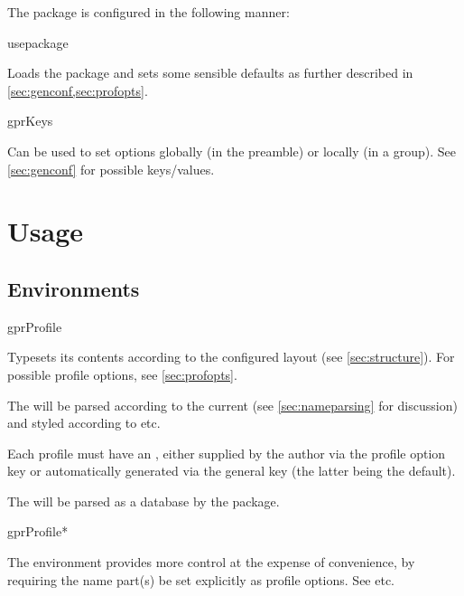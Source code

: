 \documentclass[
	a4paper,
]{article}
\begin{document}
The package is configured in the following manner:

\begin{docCommand}
	{usepackage}
	{}

	Loads the package and sets some sensible defaults as further described in \cref{sec:genconf,sec:profopts}.

\end{docCommand}

\begin{docCommand}
	{gprKeys}
	{}

	Can be used to set options globally (in the preamble) or locally (in a group). See \cref{sec:genconf} for possible keys/values.

\end{docCommand}

\section{Usage} %

\subsection{Environments} %


\begin{docEnvironment}
	{gprProfile}
	{}

	Typesets its contents according to the configured layout (see \cref{sec:structure}). For possible profile options, see \cref{sec:profopts}.

	The  will be parsed according to the current  (see \cref{sec:nameparsing} for discussion) and styled according to  etc.

	Each profile must have an , either supplied by the author via the  profile option key or automatically generated via the general  key (the latter being the default).

	The  will be parsed as a database by the  package.
	
\end{docEnvironment}

\begin{docEnvironment}
	{gprProfile*}
	{}

	The  environment provides more control at the expense of convenience, by requiring the name part(s) be set explicitly as profile options. See  etc.
	
\end{docEnvironment}
\end{document}
